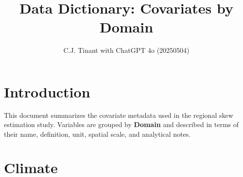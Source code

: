 \documentclass[
  10pt,
]{article}
\title{Data Dictionary: Covariates by Domain}
\author{C.J. Tinant with ChatGPT 4o (20250504)}
\date{}
\begin{document}
\maketitle

{
\setcounter{tocdepth}{2}
\tableofcontents
}
\section*{Introduction}

This document summarizes the covariate metadata used in the regional
skew estimation study. Variables are grouped by \textbf{Domain} and
described in terms of their name, definition, unit, spatial scale, and
analytical notes.

\section*{ Climate }

\begingroup\fontsize{8}{10}\selectfont
\end{document}

